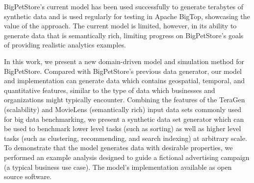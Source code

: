 \documentclass[conference]{IEEEtran}
\begin{document}
BigPetStore's current model has been used successfully to generate terabytes of synthetic data and is used regularly for testing in Apache BigTop, showcasing the value of the approach.  The current model is limited, however, in its ability to generate data that is semantically rich, limiting progress on BigPetStore's goals of providing realistic analytics examples.

In this work, we present a new domain-driven model and simulation method for BigPetStore.  Compared with BigPetStore's previous data generator, our model and implementation can generate data which contains geospatial, temporal, and quantitative features, similar to the type of data which businesses and organizations might typically encounter.  Combining the features of the TeraGen (scalability)  and MovieLens \cite{MovieLens} (semantically rich) input data sets commonly used for big data benchmarking, we present a synthetic data set generator which can be used to benchmark lower level tasks (such as sorting) as well as higher level tasks (such as clustering, recommending, and search indexing) at arbitrary scale.  To demonstrate that the model generates data with desirable properties, we performed an example analysis designed to guide a fictional advertising campaign (a typical business use case). The model's implementation available as open source software.


\end{document}
